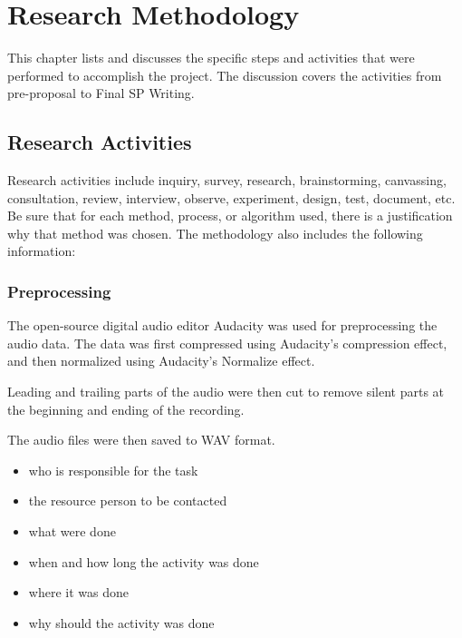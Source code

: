 \chapter{Research Methodology}
This chapter lists and discusses the specific steps and activities that  were  performed  to accomplish the project. 
The discussion covers the activities from pre-proposal to Final SP Writing.

\section{Research Activities}
Research activities include inquiry, survey, research, brainstorming, canvassing, consultation, review, interview, observe, experiment, design, test, document, etc.  
Be sure that for each method, process, or algorithm used, there is a justification why that method was chosen.
The methodology also includes the following information:

\subsection{Preprocessing}
The open-source digital audio editor Audacity was used for preprocessing the audio data. The data was first compressed using Audacity's compression effect, and then normalized using Audacity's Normalize effect.

Leading and trailing parts of the audio were then cut to remove silent parts at the beginning and ending of the recording.

The audio files were then saved to WAV format.

\begin{itemize}
   \item who is responsible for the task
   \item the resource person to be contacted
   \item what were done
   \item when and how long the activity was  done
   \item where it was done
   \item why should the activity was done
\end{itemize}


